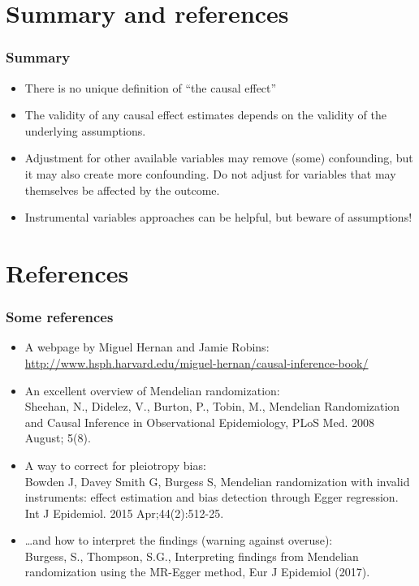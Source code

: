 \documentclass{beamer}
\begin{document}
\section{Summary and references}
\begin{frame}
\frametitle{Summary}
\begin{itemize}
\item There is no unique definition of ``the causal effect'' 
\item The validity of any causal effect estimates depends on the validity of the underlying assumptions.
\item Adjustment for other available variables may remove (some) confounding, but it may also create more confounding. \alert{Do not adjust for variables that may themselves be affected by the outcome.}   
\item Instrumental variables approaches can be helpful, but beware of assumptions! 
\end{itemize}
\end{frame}



\section{References}
\begin{frame}
\frametitle{Some references}
{\small
\begin{itemize}
\item A webpage by Miguel Hernan and Jamie Robins: 
\href{http://www.hsph.harvard.edu/miguel-hernan/causal-inference-book/}{http://www.hsph.harvard.edu/miguel-hernan/causal-inference-book/}
\item An excellent overview of Mendelian randomization: \\
Sheehan, N., Didelez, V., Burton, P., Tobin, M., Mendelian Randomization and Causal Inference in Observational Epidemiology, PLoS Med. 2008 August; 5(8). 
\item A way to correct for pleiotropy bias: \\
Bowden J, Davey Smith G, Burgess S, Mendelian randomization with invalid instruments: effect estimation and bias detection through Egger regression. Int J Epidemiol. 2015 Apr;44(2):512-25.
\item \ldots and how to interpret the findings (warning against overuse): \\ Burgess, S., Thompson, S.G., Interpreting findings from Mendelian randomization using the MR-Egger method, Eur J Epidemiol (2017). 
\end{itemize}}
\end{frame}
\end{document}
